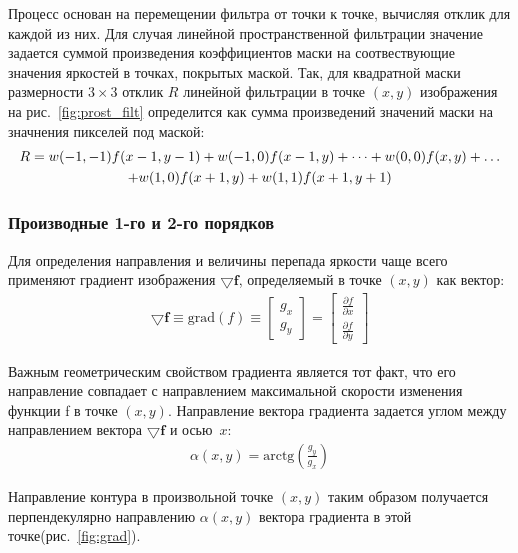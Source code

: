 \documentclass[12pt]{article} %
\begin{document}
\newpage

Процесс основан на перемещении фильтра от точки к точке, вычисляя отклик для каждой из них. Для случая линейной пространственной фильтрации значение задается суммой произведения коэффициентов маски на соотвествующие значения яркостей в точках, покрытых маской. Так, для квадратной маски размерности $3\times3$ отклик $R$ линейной фильтрации в точке $(x, y)$ изображения на рис.~\ref{fig:prost_filt} определится как сумма произведений значений маски на значнения пикселей под маской:
\begin{gather}\label{3.1}
R = w(-1,-1)f(x-1, y-1) + w(-1,0)f(x-1,y)+\dots +w(0,0)f(x,y)+\dots \notag\\
+ w(1,0)f(x+1, y)+w(1,1)f(x+1, y+1)
\end{gather}

\subsubsection{Производные 1-го и 2-го порядков}

Для определения направления и величины перепада яркости чаще всего применяют градиент изображения $\bigtriangledown \mathbf{f}$, определяемый в точке $(x,y)$ как вектор:
\begin{gather}\label{grad}
	\bigtriangledown \mathbf{f} \equiv \text{grad}(f)\equiv
	\begin{bmatrix} g_x \\ g_y \end{bmatrix}=
	\begin{bmatrix} \frac{\partial f}{\partial x} \\ \frac{\partial f}{\partial y}
	\end{bmatrix}
\end{gather}

Важным геометрическим свойством градиента является тот факт, что его направление совпадает с направлением максимальной скорости изменения функции f в точке $(x, y)$. Направление вектора градиента задается углом между направлением вектора $\bigtriangledown \mathbf{f}$ и осью~$x$:
\begin{gather}\label{grad_alpha}
	\alpha(x, y) = \text{arctg}\left(\frac{g_y}{g_x}\right)
\end{gather}

Направление контура в произвольной точке $(x,y)$ таким образом получается перпендекулярно направлению $\alpha(x,y)$ вектора градиента в этой точке(рис.~\ref{fig:grad}).
\end{document}
